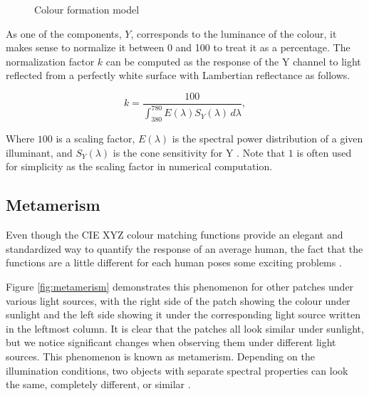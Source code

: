 \begin{figure}
    \centering
    \caption{Colour formation model}
    \label{fig:light}
\end{figure}

As one of the components, $Y$, corresponds to the luminance of the colour, it makes sense to normalize it between 0 and 100 to treat it as a percentage. The normalization factor $k$ can be computed as the response of the Y channel to light reflected from a perfectly white surface with Lambertian reflectance as follows.

\begin{equation}
\label{eq:normalization}
 k = \frac{100}{\int_{380}^{780} E(\lambda) S_Y(\lambda) \, d\lambda},
\end{equation}

Where $100$ is a scaling factor, $E(\lambda)$ is the spectral power distribution of a given illuminant, and $S_Y(\lambda)$ is the cone sensitivity for Y \cite{rowlands2020physics}. Note that $1$ is often used for simplicity as the scaling factor in numerical computation.

\subsection{Metamerism}
\label{ss:metamerism}
Even though the CIE XYZ colour matching functions provide an elegant and standardized way to quantify the response of an average human, the fact that the functions are a little different for each human poses some exciting problems \cite[118]{measuringcolour}. 

Figure \ref{fig:metamerism} demonstrates this phenomenon for other patches under various light sources, with the right side of the patch showing the colour under sunlight and the left side showing it under the corresponding light source written in the leftmost column. It is clear that the patches all look similar under sunlight, but we notice significant changes when observing them under different light sources. This phenomenon is known as metamerism. Depending on the illumination conditions, two objects with separate spectral properties can look the same, completely different, or similar \cite[117-121]{metamerism}.

